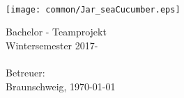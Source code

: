 \begin{titlepage}
\begin{center}
{}\\[5ex]

\texttt{[image: common/Jar\_seaCucumber.eps]}\setlength{\unitlength}{1mm}

Bachelor - Teamprojekt\\
Wintersemester 2017-\the\year\\[6ex]

{}\\[5ex]

Betreuer: \betreuer\\[5ex]



\vfill
Braunschweig, \today

\end{center}
\end{titlepage}
